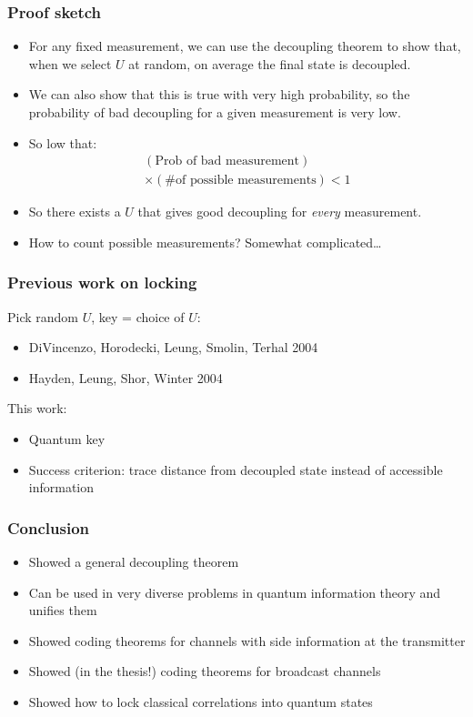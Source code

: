 \documentclass[12pt]{beamer}
\begin{document}
\begin{frame}
	\frametitle{Proof sketch}
	\begin{itemize}
		\item For any fixed measurement, we can use the decoupling theorem to show that, when we select $U$ at random, on average the final state is decoupled.
	\item We can also show that this is true with very high probability, so the probability of bad decoupling for a given measurement is very low.
	\item So low that:
		\begin{multline*}
		 \left( \mbox{Prob of bad measurement}\right)\\
		 \times (\mbox{\# of possible measurements}) < 1
		\end{multline*}
	\item So there exists a $U$ that gives good decoupling for \emph{every} measurement.
	\item How to count possible measurements? Somewhat complicated\ldots
	\end{itemize}
\end{frame}

\begin{frame}
	\frametitle{Previous work on locking}
	Pick random $U$, key = choice of $U$:
	\begin{itemize}
		\item DiVincenzo, Horodecki, Leung, Smolin, Terhal 2004
		\item Hayden, Leung, Shor, Winter 2004
	\end{itemize}
	This work:
	\begin{itemize}
		\item Quantum key
		\item Success criterion: trace distance from decoupled state instead of accessible information
	\end{itemize}
\end{frame}

\begin{frame}
	\frametitle{Conclusion}
	\begin{itemize}
	\item Showed a general decoupling theorem
	\item Can be used in very diverse problems in quantum information theory and unifies them
	\item Showed coding theorems for channels with side information at the transmitter
	\item Showed (in the thesis!) coding theorems for broadcast channels
	\item Showed how to lock classical correlations into quantum states
	\end{itemize}
\end{frame}
\end{document}
